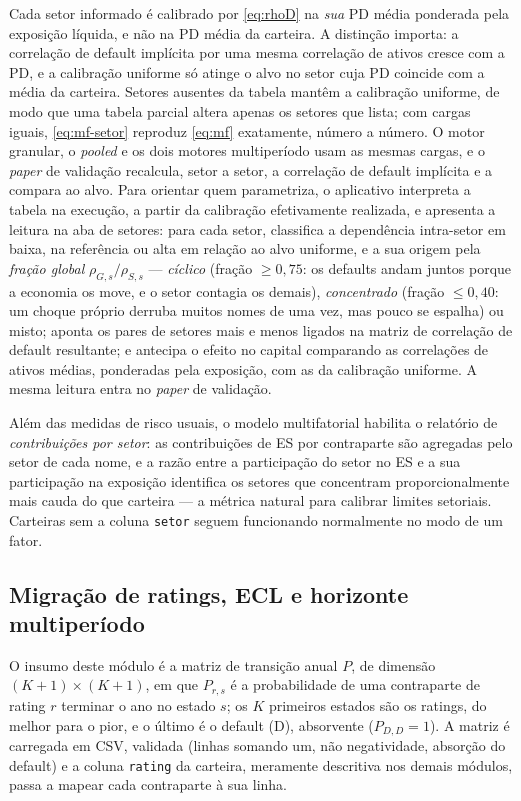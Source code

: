\documentclass[11pt,a4paper]{article}
\begin{document}
Cada setor informado é calibrado por \eqref{eq:rhoD} na \emph{sua} PD média ponderada pela exposição líquida, e não na PD média da carteira. A distinção importa: a correlação de default implícita por uma mesma correlação de ativos cresce com a PD, e a calibração uniforme só atinge o alvo no setor cuja PD coincide com a média da carteira. Setores ausentes da tabela mantêm a calibração uniforme, de modo que uma tabela parcial altera apenas os setores que lista; com cargas iguais, \eqref{eq:mf-setor} reproduz \eqref{eq:mf} exatamente, número a número. O motor granular, o \emph{pooled} e os dois motores multiperíodo usam as mesmas cargas, e o \emph{paper} de validação recalcula, setor a setor, a correlação de default implícita e a compara ao alvo. Para orientar quem parametriza, o aplicativo interpreta a tabela na execução, a partir da calibração efetivamente realizada, e apresenta a leitura na aba de setores: para cada setor, classifica a dependência intra-setor em baixa, na referência ou alta em relação ao alvo uniforme, e a sua origem pela \emph{fração global} $\rho_{G,s}/\rho_{S,s}$ --- \emph{cíclico} (fração $\ge0{,}75$: os defaults andam juntos porque a economia os move, e o setor contagia os demais), \emph{concentrado} (fração $\le0{,}40$: um choque próprio derruba muitos nomes de uma vez, mas pouco se espalha) ou misto; aponta os pares de setores mais e menos ligados na matriz de correlação de default resultante; e antecipa o efeito no capital comparando as correlações de ativos médias, ponderadas pela exposição, com as da calibração uniforme. A mesma leitura entra no \emph{paper} de validação.

Além das medidas de risco usuais, o modelo multifatorial habilita o relatório de \emph{contribuições por setor}: as contribuições de ES por contraparte são agregadas pelo setor de cada nome, e a razão entre a participação do setor no ES e a sua participação na exposição identifica os setores que concentram proporcionalmente mais cauda do que carteira --- a métrica natural para calibrar limites setoriais. Carteiras sem a coluna \texttt{setor} seguem funcionando normalmente no modo de um fator.

\subsection{Migração de ratings, ECL e horizonte multiperíodo}
\label{sec:migracao}

O insumo deste módulo é a matriz de transição anual $P$, de dimensão $(K+1)\times(K+1)$, em que $P_{r,s}$ é a probabilidade de uma contraparte de rating $r$ terminar o ano no estado $s$; os $K$ primeiros estados são os ratings, do melhor para o pior, e o último é o default (D), absorvente ($P_{D,D}=1$). A matriz é carregada em CSV, validada (linhas somando um, não negatividade, absorção do default) e a coluna \texttt{rating} da carteira, meramente descritiva nos demais módulos, passa a mapear cada contraparte à sua linha.
\end{document}
